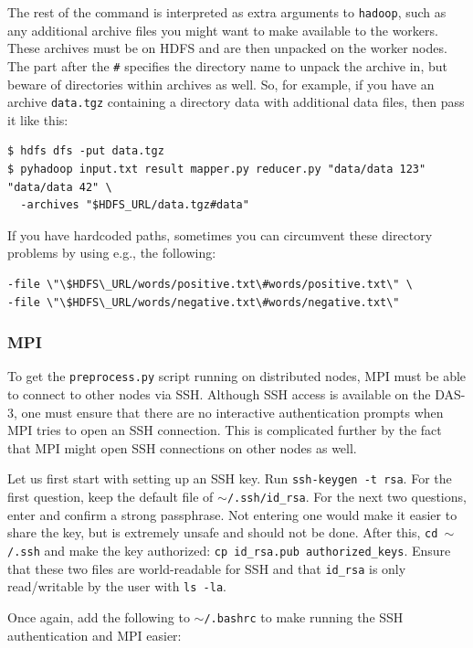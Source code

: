 \documentclass{article}
\begin{document}
The rest of the command is interpreted as extra arguments to \texttt{hadoop}, 
such as any additional archive files you might want to make available to the 
workers. These archives must be on HDFS and are then unpacked on the worker 
nodes. The part after the \texttt{\#} specifies the directory name to unpack 
the archive in, but beware of directories within archives as well. So, for 
example, if you have an archive \texttt{data.tgz} containing a directory data 
with additional data files, then pass it like this:

\begin{verbatim}
$ hdfs dfs -put data.tgz
$ pyhadoop input.txt result mapper.py reducer.py "data/data 123" "data/data 42" \
  -archives "$HDFS_URL/data.tgz#data"
\end{verbatim}

If you have hardcoded paths, sometimes you can circumvent these directory 
problems by using e.g., the following:
\begin{verbatim}
-file \"\$HDFS\_URL/words/positive.txt\#words/positive.txt\" \
-file \"\$HDFS\_URL/words/negative.txt\#words/negative.txt\"
\end{verbatim}

\subsubsection{MPI}\label{app:mpi}
To get the \texttt{preprocess.py} script running on distributed nodes, MPI must 
be able to connect to other nodes via SSH\@. Although SSH access is available on
the DAS-3, one must ensure that there are no interactive authentication prompts
when MPI tries to open an SSH connection. This is complicated further by the fact
that MPI might open SSH connections on other nodes as well.

Let us first start with setting up an SSH key. Run \texttt{ssh-keygen -t rsa}. 
For the first question, keep the default file of \texttt{$\sim$/.ssh/id\_rsa}. 
For the next two questions, enter and confirm a strong passphrase. Not entering 
one would make it easier to share the key, but is extremely unsafe and should 
not be done. After this, \texttt{cd $\sim$/.ssh} and make the key authorized: 
\texttt{cp id\_rsa.pub authorized\_keys}. Ensure that these two files are 
world-readable for SSH and that \texttt{id\_rsa} is only read/writable by the 
user with \texttt{ls -la}.

Once again, add the following to \texttt{$\sim$/.bashrc} to make running the 
SSH authentication and MPI easier:
\end{document}
